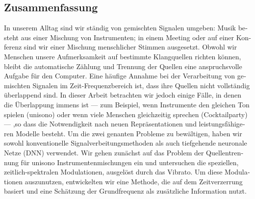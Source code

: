 \begin{otherlanguage}{ngerman}
\chapter*{Zusammenfassung}

In unserem Alltag sind wir ständig von gemischten Signalen umgeben: Musik besteht aus einer Mischung von Instrumenten; in einem Meeting oder auf einer Konferenz sind wir einer Mischung menschlicher Stimmen ausgesetzt.
Obwohl wir Menschen unsere Aufmerksamkeit auf bestimmte Klangquellen richten können, bleibt die automatische Zählung und Trennung der Quellen eine anspruchsvolle Aufgabe für den Computer.
Eine häufige Annahme bei der Verarbeitung von gemischten Signalen im Zeit-Frequenzbereich ist, dass ihre Quellen nicht vollständig überlappend sind.
In dieser Arbeit betrachten wir jedoch einige Fälle, in denen die Überlappung immens ist --- zum Beispiel, wenn Instrumente den gleichen Ton spielen (unisono) oder wenn viele Menschen gleichzeitig sprechen (Cocktailparty) --- ,so dass die Notwendigkeit nach neuen Repräsentationen und leistungsfähigeren Modelle besteht.
Um die zwei genanten Probleme zu bewältigen, haben wir sowohl konventionelle Signalverbeitungsmethoden als  auch tiefgehende neuronale Netze (DNN) verwendet.
Wir gehen zunächst auf das Problem der Quellentrennung für unisono Instrumentenmischungen ein und untersuchen die speziellen, zeitlich-spektralen Modulationen, ausgelöst durch das Vibrato.
Um diese Modulationen auszunutzen, entwickelten wir eine Methode, die auf dem Zeitverzerrung basiert und eine Schätzung der Grundfrequenz als zusätzliche Information nutzt.


\end{otherlanguage}
